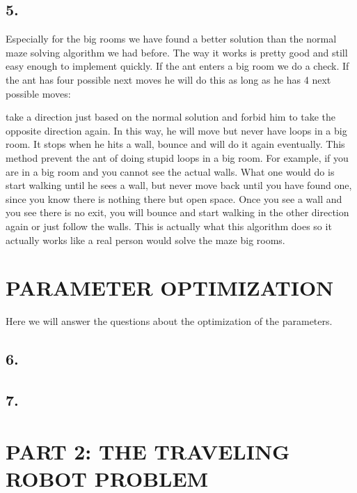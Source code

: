 \documentclass{scrartcl}
\begin{document}
\subsection*{5.}
Especially for the big rooms we have found a better solution than the normal maze solving algorithm we had before. The way it works is pretty good and still easy enough to implement quickly. If the ant enters a big room we do a check. If the ant has four possible next moves he will do this as long as he has 4 next possible moves:\par
take a direction just based on the normal solution and forbid him to take the opposite direction again.
In this way, he will move but never have loops in a big room. It stops when he hits a wall, bounce and will do it again eventually. This method prevent the ant of doing stupid loops in a big room. For example, if you are in a big room and you cannot see the actual walls. What one would do is start walking until he sees a wall, but never move back until you have found one, since you know there is nothing there but open space. Once you see a wall and you see there is no exit, you will bounce and start walking in the other direction again or just follow the walls. This is actually what this algorithm does so it actually works like a real person would solve the maze big rooms.

\section*{PARAMETER OPTIMIZATION}
Here we will answer the questions about the optimization of the parameters.
\subsection*{6.}
\subsection*{7.}




















\pagebreak
\section*{PART 2: THE TRAVELING ROBOT PROBLEM}
\end{document}
